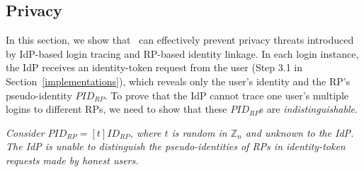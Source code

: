 {%

\subsection{Privacy}
\label{sec-:analysis}
In this section, we show that \usso~can effectively prevent privacy threats introduced by IdP-based login tracing and RP-based identity linkage. \newc In each login instance, the IdP receives an identity-token request from the user (Step 3.1 in Section~\ref{implementations}), which reveals only the user's identity and the RP's pseudo-identity $PID_{RP}$. To prove that the IdP cannot trace one user's multiple logins to different RPs, we need to show that these $PID_{RP}$s are \emph{indistinguishable}.

\vspace{1mm}
 {\em Consider $PID_{RP} = [t]ID_{RP}$, where $t$ is random in $\mathbb{Z}_n$ and unknown to the IdP. The IdP is unable to distinguish the pseudo-identities of RPs in identity-token requests made by honest users.}

\vspace{0.75mm}
}
